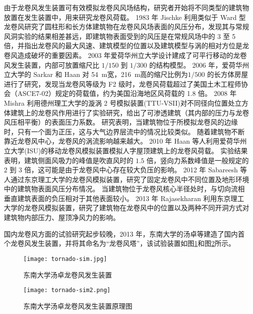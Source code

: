 由于龙卷风发生装置可有效模拟龙卷风风场结构，研究者开始将不同类型的建筑物放置在发生装置中，用来研究龙卷风荷载。
1983 年 Jischke \cite{jischke1983laboratory}利用类似于 Ward 型龙卷风研究了圆柱形和长方体建筑物在龙卷风风场表面的风压分布，发现其与常规风洞实验的结果相差甚远，即建筑物表面受到的风压是在常规风场中的 3 至 5 倍，并指出龙卷风的最大风速、建筑模型的位置以及建筑模型与涡的相对方位是龙卷风造成破坏的重要因素。
2003 年爱荷华州立大学设计建成了可平行移动的龙卷风发生装置，内部可放置缩尺比 $1/150$ 到 $1/300$ 的结构模型。
2006 年，爱荷华州立大学的 Sarkar 和 Haan \cite{haan2009tornado}对 \SI{54}{m}宽，\SI{216}{m}高的缩尺比例为$1/500$ 的长方体房屋进行了研究，发现当龙卷风等级为 F2 级时，龙卷风荷载超过了美国土木工程师协会（ASCE7-02）规定的荷载值，约为美国沿海地区风荷载的 1.8 倍。
2008 年 Mishra \cite{mishra2008physical}利用德州理工大学的漩涡 2 号模拟装置(TTU-VSII)对不同径向位置处立方体建筑上的龙卷风作用进行了实验研究，给出了可渗透建筑（其内部的压力与龙卷风压相平衡）的表面压力系数。
研究表明，当建筑物位于所模拟龙卷风的边缘时，只有一个面为正压，这与大气边界层流中的情况比较类似。
随着建筑物不断靠近龙卷风中心，龙卷风的涡流影响越来越大。
2010 年 Haan \cite{haan2009tornado}等人利用爱荷华州立大学(ISU)的移动龙卷风模拟装置模拟人字屋顶建筑上的龙卷风荷载。
实验结果表明，建筑侧面风吸力的峰值是吹直风时的 $1.5$ 倍，竖向力系数峰值是一般规定的 $2$ 到 $3$ 倍，这可能是由于龙卷风中心存在较大负压的影响。
2012 年 Sabareesh 等人\cite{sabareesh2012dependence}通过东京理工大学的龙卷风模拟装置，研究了固定龙卷风中不同位置及地形环境中的建筑物表面风压分布情况。
当建筑物位于龙卷风核心半径处时，与切向流相垂直建筑表面的负压相对于其他表面较小。
2013 年 Rajasekharan \cite{rajasekharan2013characteristics}利用东京理工大学的龙卷风模拟装置，研究了建筑物在龙卷风中的位置以及两种不同开洞方式对建筑物内部压力、屋顶净风力的影响。

国内龙卷风方面的试验研究起步较晚，2013 年，东南大学的汤卓等建造了国内首个龙卷风发生装置，并将其命名为“龙卷风塔”，该试验装置如图\ref{fig:seu-tornado}和图\ref{fig:seu-tornado2}所示。
\begin{figure}[!htbp]
    \centering
    \texttt{[image: tornado-sim.jpg]}
    \caption{东南大学汤卓龙卷风发生装置}
    \label{fig:seu-tornado}
\end{figure}

\begin{figure}[!htbp]
    \centering
    \texttt{[image: tornado-sim2.png]}
    \caption{东南大学汤卓龙卷风发生装置原理图}
    \label{fig:seu-tornado2}
\end{figure}

